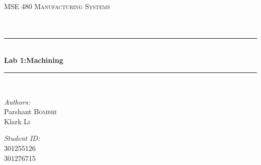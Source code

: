 \documentclass[12pt]{article}
\begin{document}
\begin{titlepage}

\newcommand{\HRule}{\rule{\linewidth}{0.5mm}} %

\center %
 

\textsc{\LARGE MSE 480 Manufacturing Systems}\\[1.5cm] %
\textsc{\Large }\\[0.5cm] %
\textsc{\large }\\[0.5cm] %


\HRule \\[0.4cm]
{ \huge \bfseries Lab 1:Machining}\\[0.4cm] %
\HRule \\[1.5cm]
 

\begin{minipage}{0.4\textwidth}
    \begin{flushleft} \large
        \emph{Authors:}\\
        Parshant \textsc{Bombhi}\\
        Klark \textsc{Li}
    \end{flushleft}
\end{minipage}
\hfill
\begin{minipage}{0.4\textwidth}
    \begin{flushright} \large
        \emph{Student ID:} \\
        301255126\\
        301276715
    \end{flushright}
\end{minipage}
\vspace{10mm}


\end{titlepage}
\end{document}
